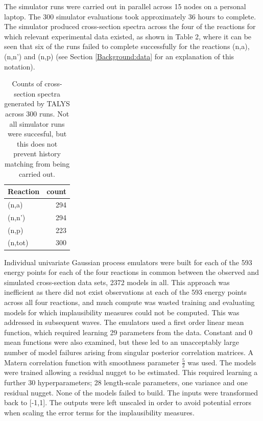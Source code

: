 \documentclass[
  12pt,
  a4paper,
  twoside]{book}
\begin{document}
The simulator runs were carried out in parallel across 15 nodes on a personal laptop. The 300 simulator evaluations took approximately 36 hours to complete. The simulator produced cross-section spectra across the four of the reactions for which relevant experimental data existed, as shown in Table 2, where it can be seen that six of the runs failed to complete successfully for the reactions (n,a), (n,n') and (n,p) (see Section \ref{Background:data} for an explanation of this notation).

\begin{table}

\caption{\label{tab:run-data}Counts of cross-section spectra generated by TALYS across 300 runs. Not all simulator runs were succesful, but this does not prevent history matching from being carried out.}
\centering
\begin{tabular}[t]{l|r}
\hline
Reaction & count\\
\hline
(n,a) & 294\\
\hline
(n,n') & 294\\
\hline
(n,p) & 223\\
\hline
(n,tot) & 300\\
\hline
\end{tabular}
\end{table}

Individual univariate Gaussian process emulators were built for each of the 593 energy points for
each of the four reactions in common between the observed and simulated cross-section data sets, 2372 models in all. This approach was inefficient as there did not exist observations at each of the 593 energy points across all four reactions, and much compute was wasted training and evaluating models for which implausibility measures could not be computed. This was addressed in subsequent waves. The emulators used a first order linear mean function, which required learning 29 parameters from the data. Constant and 0 mean functions were also examined, but these led to an unacceptably large number of model failures arising from singular posterior correlation matrices. A Matern correlation function with smoothness parameter \(\frac{5}{2}\) was used. The models were trained allowing a residual nugget to be estimated. This required learning a further 30 hyperparameters; 28 length-scale parameters, one variance and one residual nugget. None of the models failed to build. The inputs were transformed back to {[}-1,1{]}. The outputs were left unscaled in order to avoid potential errors when scaling the error terms for the implausibility measures.
\end{document}
